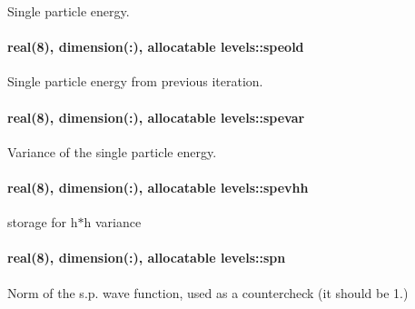 Single particle energy. 

\paragraph[{\texorpdfstring{speold}{speold}}]{\setlength{\rightskip}{0pt plus 5cm}real(8), dimension(\+:), allocatable levels\+::speold}\hypertarget{namespacelevels_ac7f33a0c4c0ea6de1a91e776c8f9ce61}{}\label{namespacelevels_ac7f33a0c4c0ea6de1a91e776c8f9ce61}


Single particle energy from previous iteration. 

\paragraph[{\texorpdfstring{spevar}{spevar}}]{\setlength{\rightskip}{0pt plus 5cm}real(8), dimension(\+:), allocatable levels\+::spevar}\hypertarget{namespacelevels_ad173ad37dacc33126c033bd445f91784}{}\label{namespacelevels_ad173ad37dacc33126c033bd445f91784}


Variance of the single particle energy. 

\paragraph[{\texorpdfstring{spevhh}{spevhh}}]{\setlength{\rightskip}{0pt plus 5cm}real(8), dimension(\+:), allocatable levels\+::spevhh}\hypertarget{namespacelevels_acc8c684273be2d8e414d8220a6e83d59}{}\label{namespacelevels_acc8c684273be2d8e414d8220a6e83d59}


storage for h$\ast$h variance 

\paragraph[{\texorpdfstring{spn}{spn}}]{\setlength{\rightskip}{0pt plus 5cm}real(8), dimension(\+:), allocatable levels\+::spn}\hypertarget{namespacelevels_a86fa1ec0b32aa8e96038b6ce7591d586}{}\label{namespacelevels_a86fa1ec0b32aa8e96038b6ce7591d586}


Norm of the s.\+p. wave function, used as a countercheck (it should be 1.) 

